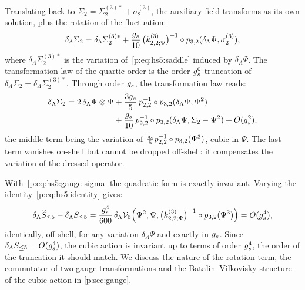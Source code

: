 Translating back to $\Sigma_2 = \Sigma_2^{(3)*} + \sigma_2^{(3)}$, the auxiliary field transforms as its own solution, plus the rotation of the fluctuation:
\begin{equation}
  \label{p:eq:hs5:gauge-sigma}
  \delta_\Lambda \Sigma_2
    = \delta_\Lambda \Sigma_2^{(3)*}
      + \frac{\gs}{10} \, \big( \kin{2}{\Psi}{3} \big)^{-1} \circ \sprod{3}{2}(\delta_\Lambda \Psi, \sigma_2^{(3)}),
\end{equation}
where $\delta_\Lambda \Sigma_2^{(3)*}$ is the variation of~\eqref{p:eq:hs5:saddle} induced by $\delta_\Lambda \Psi$.
The transformation law of the quartic order is the order-$g_s^0$ truncation of $\delta_\Lambda \Sigma_2 = \delta_\Lambda \Sigma_2^{(3)*}$.
Through order $g_s$, the transformation law reads:
\begin{equation}
  \label{p:eq:hs5:gauge-sigma-g1}
  \begin{aligned}
    \delta_\Lambda \Sigma_2
      = 2 \, \delta_\Lambda \Psi \otimes \Psi
        &
        + \frac{3 g_s}{5} \, p_{2,2}^{-1} \circ p_{3,2}(\delta_\Lambda \Psi, \Psi^2)
        \\ &
        + \frac{g_s}{10} \, p_{2,2}^{-1} \circ p_{3,2}(\delta_\Lambda \Psi, \Sigma_2 - \Psi^2)
        + O(g_s^2),
    \end{aligned}
\end{equation}
the middle term being the variation of $\tfrac{g_s}{5} p_{2,2}^{-1} \circ p_{3,2}(\Psi^3)$, cubic in $\Psi$.
The last term vanishes on-shell but cannot be dropped off-shell: it compensates the variation of the dressed operator.

With~\eqref{p:eq:hs5:gauge-sigma} the quadratic form is exactly invariant.
Varying the identity~\eqref{p:eq:hs5:identity} gives:
\begin{equation}
  \label{p:eq:hs5:delta-S-equal}
  \delta_\Lambda \caction[\le 5] - \delta_\Lambda S_{\le 5}
    = \frac{\gs^4}{600} \, \delta_\Lambda \vertex{5}\Big( \Psi^2, \Psi, \big( \kin{2}{\Psi}{3} \big)^{-1} \circ \sprod{3}{2}(\Psi^3) \Big)
    = O(\gs^4),
\end{equation}
identically, off-shell, for any variation $\delta_\Lambda \Psi$ and exactly in $g_s$.
Since $\delta_\Lambda S_{\le 5} = O(g_s^4)$, the cubic action is invariant up to terms of order $g_s^4$, the order of the truncation it should match.
We discuss the nature of the rotation term, the commutator of two gauge transformations and the Batalin--Vilkovisky structure of the cubic action in \cref{p:sec:gauge}.


